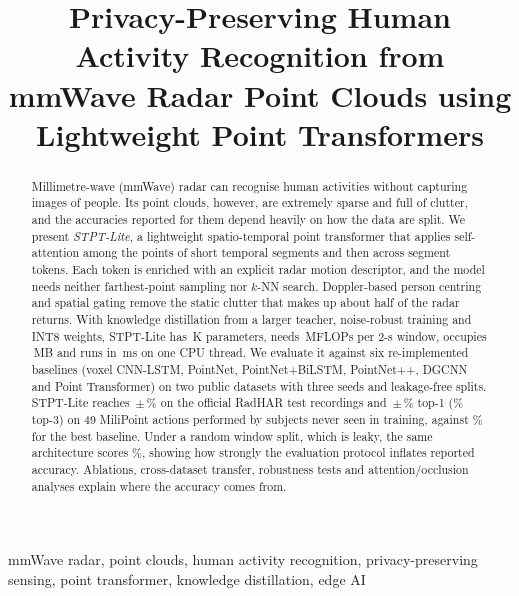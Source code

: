 \documentclass[conference]{IEEEtran}
\begin{document}
\title{Privacy-Preserving Human Activity Recognition from mmWave Radar Point Clouds using Lightweight Point Transformers}

\author{
}

\maketitle

\begin{abstract}
Millimetre-wave (mmWave) radar can recognise human activities without capturing
images of people. Its point clouds, however, are extremely sparse and full of
clutter, and the accuracies reported for them depend heavily on how the data are
split. We present \emph{STPT-Lite}, a lightweight spatio-temporal point
transformer that applies self-attention among the points of short temporal
segments and then across segment tokens. Each token is enriched with an explicit
radar motion descriptor, and the model needs neither farthest-point sampling nor
$k$-NN search. Doppler-based person centring and spatial gating remove the static
clutter that makes up about half of the radar returns. With knowledge
distillation from a larger teacher, noise-robust training and INT8 weights, STPT-Lite has
\oursParamsK\,K parameters, needs \oursMflops\,MFLOPs per 2-s window, occupies
\oursIntMB\,MB and runs in \oursLat\,ms on one CPU thread. We evaluate it against
six re-implemented baselines (voxel CNN-LSTM, PointNet, PointNet+BiLSTM,
PointNet++, DGCNN and Point Transformer) on two public datasets with three seeds
and leakage-free splits. STPT-Lite reaches \rhOursAcc\,$\pm$\,\rhOursStd\% on the
official RadHAR test recordings and \mpOursAcc\,$\pm$\,\mpOursStd\% top-1
(\mpOursTopthree\% top-3) on 49 MiliPoint actions performed by subjects never
seen in training, against \mipointnetAcc\% for the best baseline. Under a random
window split, which is leaky, the same architecture scores \mpRandomAcc\%, showing how strongly the evaluation protocol inflates
reported accuracy. Ablations, cross-dataset transfer, robustness tests and
attention/occlusion analyses explain where the accuracy comes from.
\end{abstract}

\begin{IEEEkeywords}
mmWave radar, point clouds, human activity recognition, privacy-preserving sensing, point transformer, knowledge distillation, edge AI
\end{IEEEkeywords}
\end{document}
